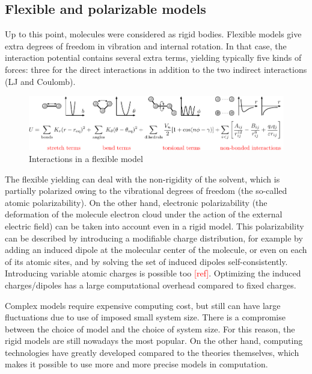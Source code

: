 \subsection{Flexible and polarizable models}

Up to this point, molecules were considered as rigid bodies. Flexible
models give extra degrees of freedom in vibration and internal rotation.
In that case, the interaction potential contains several extra terms,
yielding typically five kinds of forces: three for the direct interactions
in addition to the two indirect interactions (LJ and Coulomb).

\begin{figure}[h]
\begin{centering}
\includegraphics[width=1\columnwidth]{_figure/flexible}
\par\end{centering}
\caption{Interactions in a flexible model}
\end{figure}

The flexible yielding can deal with the non-rigidity of the solvent,
which is partially polarized owing to the vibrational degrees of freedom
(the so-called atomic polarizability). On the other hand, electronic
polarizability (the deformation of the molecule electron cloud under
the action of the external electric field) can be taken into account
even in a rigid model. This polarizability can be described by introducing
a modifiable charge distribution, for example by adding an induced
dipole at the molecular center of the molecule, or even on each of
its atomic sites, and by solving the set of induced dipoles self-consistently.
Introducing variable atomic charges is possible too \textcolor{red}{{[}ref{]}}.
Optimizing the induced charges/dipoles has a large computational overhead
compared to fixed charges.

Complex models require expensive computing cost, but still can have
large fluctuations due to use of imposed small system size. There
is a compromise between the choice of model and the choice of system
size. For this reason, the rigid models are still nowadays the most
popular. On the other hand, computing technologies have greatly developed
compared to the theories themselves, which makes it possible to use
more and more precise models in computation. 

